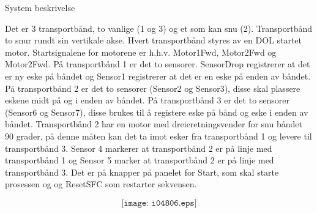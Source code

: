 

System beskrivelse

Det er 3 transportbånd, to vanlige (1 og 3) og et som kan snu (2). Transportbånd to snur rundt sin vertikale akse. Hvert transportbånd styres av en DOL startet motor. Startsignalene
for motorene er h.h.v. Motor1Fwd, Motor2Fwd og Motor2Fwd. På transportbånd 1 er det to sensorer. SensorDrop registrerer at det er ny eske på båndet og Sensor1 registrerer at det er en eske på enden av båndet. På transportbånd 2 er det to sensorer (Sensor2 og Sensor3), disse skal plassere eskene midt på og i enden av båndet. På transportbånd 3 er det to sensorer (Sensor6 og Sensor7), disse brukes til å registere eske på bånd og eske i enden av båndet. Transportbånd 2 har en motor med dreieretningsvender for snu båndet 90 grader, på denne måten kan det ta imot esker fra transportbånd 1 og levere til transportbånd 3. Sensor 4 markerer at transportbånd 2 er på linje med transportbånd 1 og Sensor 5 marker at transportbånd 2 er på linje med transportbånd 3. Det er på knapper på panelet for Start, som skal starte prosessen og og ResetSFC som restarter sekvensen.   

$$\texttt{[image: i04806.eps]}$$


